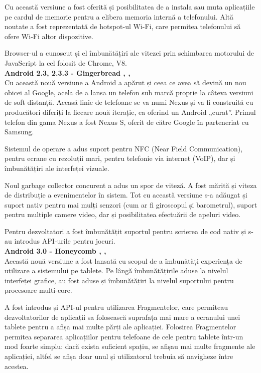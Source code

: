 \documentclass[12pt, a4paper, oneside]{article}
\begin{document}
	Cu această versiune a fost oferită și posibilitatea de a instala sau muta aplicațiile pe cardul de memorie pentru a elibera memoria internă a telefonului. Altă noutate a fost reprezentată de hotspot-ul Wi-Fi, care permitea telefonului să ofere Wi-Fi altor dispozitive.

	Browser-ul a cunoscut și el îmbunătățiri ale vitezei prin schimbarea motorului de JavaScript la cel folosit de Chrome, V8.\\

\textbf{Android 2.3, 2.3.3 - Gingerbread \cite{AndroidVersionsHistory}, \cite{AndroidHistory}, \cite{DeveloperAndroid}}\\
Cu această nouă versiune a Android a apărut și ceea ce avea să devină un nou obicei al Google, acela de a lansa un telefon sub marcă proprie la câteva versiuni de soft distanță. Aceasă linie de telefoane se va numi Nexus și va fi construită cu producători diferiți la fiecare nouă iterație, ea oferind un Android „curat”. Primul telefon din gama Nexus a fost Nexus S, oferit de către Google în parteneriat cu Samsung.

	Sistemul de operare a adus suport pentru NFC (Near Field Communication), pentru ecrane cu rezoluții mari, pentru telefonie via internet (VoIP), dar și îmbunătățiri ale interfeței vizuale.

	Noul garbage collector concurent a adus un spor de viteză. A fost mărită și viteza de distribuție a evenimentelor în sistem. Tot cu această versiune s-a adăugat și suport nativ pentru mai mulți senzori (cum ar fi giroscopul și barometrul), suport pentru multiple camere video, dar și posibilitatea efectuării de apeluri video.

	Pentru dezvoltatori a fost îmbunătățit suportul pentru scrierea de cod nativ și s-au introdus API-urile pentru jocuri.\\

\textbf{Android 3.0 - Honeycomb \cite{AndroidVersionsHistory}, \cite{AndroidHistory}, \cite{DeveloperAndroid}}\\
Această nouă versiune a fost lansată cu scopul de a îmbunătăți experiența de utilizare a sistemului pe tablete. Pe lângă îmbunătățirile aduse la nivelul interfeței grafice, au fost aduse și îmbunătățiri la nivelul suportului pentru procesoare multi-core.

	A fost introdus și API-ul pentru utilizarea Fragmentelor, care permiteau dezvoltatorilor de aplicații sa folosească suprafața mai mare a ecranului unei tablete pentru a afișa mai multe părți ale aplicației. Folosirea Fragmentelor permitea separarea aplicațiilor pentru telefoane de cele pentru tablete într-un mod foarte simplu: dacă exista suficient spațiu, se afișau mai multe fragmente ale aplicației, altfel se afișa doar unul și utilizatorul trebuia să navigheze între acestea.
\end{document}
